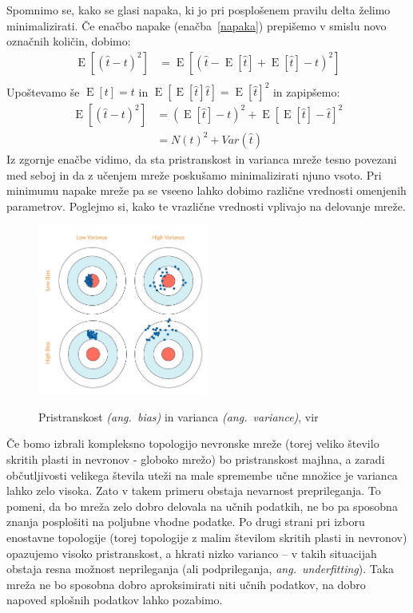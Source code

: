 \documentclass[mat1]{fmfdelo}
\begin{document}
Spomnimo se, kako se glasi napaka, ki jo pri posplošenem pravilu delta želimo minimalizirati. Če enačbo napake (enačba~\eqref{napaka}) prepišemo v smislu novo označnih količin, dobimo:
%
\begin{equation}
\begin{aligned}
\operatorname{E}[(\hat{t}-t)^2] &= \operatorname{E}[(\hat{t} -\operatorname{E}[\hat{t}] + \operatorname{E}[\hat{t}] - t)^2]  \\
\end{aligned}
\end{equation}
Upoštevamo še $\operatorname{E}[t] = t$ in $\operatorname{E}[\operatorname{E}[\hat{t}]\hat{t}] = \operatorname{E}[\hat{t}]^2$ in zapipšemo:
\begin{equation}
\begin{aligned}
\operatorname{E}[(\hat{t}-t)^2] &= (\operatorname{E}[\hat{t}] - t)^2 +\operatorname{E}[\operatorname{E}[\hat{t}] -\hat{t}]^2\\
&= N(t)^2 + Var(\hat{t})
\end{aligned}
\end{equation}
%
Iz zgornje enačbe vidimo, da sta pristranskost in varianca mreže tesno povezani med seboj in da z učenjem mreže poskušamo minimalizirati njuno vsoto. Pri minimumu napake mreže pa se vseeno lahko dobimo različne vrednosti omenjenih parametrov. Poglejmo si, kako te vrazlične vrednosti vplivajo na delovanje mreže.
%
\begin{figure}[!ht]
  \centering
    \includegraphics[width=0.5\textwidth]{bias.jpg}
  \label{fig:bis}
 \caption{Pristranskost \emph{(ang.~bias)} in varianca \emph{(ang.~variance)}, vir~\cite{bias}}
\end{figure}
%

Če bomo izbrali kompleksno topologijo nevronske mreže (torej veliko število skritih plasti in nevronov - globoko mrežo) bo pristranskost majhna, a zaradi občutljivosti velikega števila uteži na male spremembe učne množice je varianca lahko zelo visoka. Zato v takem primeru obstaja nevarnost preprileganja. To pomeni, da bo mreža zelo dobro delovala na učnih podatkih, ne bo pa sposobna znanja posplošiti na poljubne vhodne podatke.
Po drugi strani pri izboru enostavne topologije (torej topologije z malim številom skritih plasti in nevronov) opazujemo visoko pristranskost, a hkrati nizko varianco -- v takih situacijah obstaja resna možnost neprileganja (ali podprileganja, \emph{ang.~underfitting}). Taka mreža ne bo sposobna dobro aproksimirati niti učnih podatkov, na dobro napoved splošnih podatkov lahko pozabimo.
\end{document}
